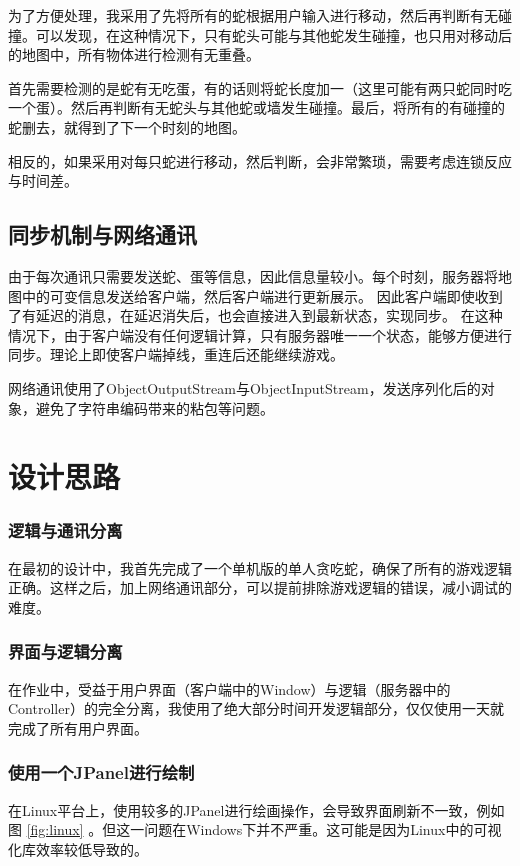 \documentclass[12pt]{article}
\begin{document}
  为了方便处理，我采用了先将所有的蛇根据用户输入进行移动，然后再判断有无碰撞。可以发现，在这种情况下，只有蛇头可能与其他蛇发生碰撞，也只用对移动后的地图中，所有物体进行检测有无重叠。
  
  首先需要检测的是蛇有无吃蛋，有的话则将蛇长度加一（这里可能有两只蛇同时吃一个蛋）。然后再判断有无蛇头与其他蛇或墙发生碰撞。最后，将所有的有碰撞的蛇删去，就得到了下一个时刻的地图。
  
  相反的，如果采用对每只蛇进行移动，然后判断，会非常繁琐，需要考虑连锁反应与时间差。
  
  \subsection*{同步机制与网络通讯}
  由于每次通讯只需要发送蛇、蛋等信息，因此信息量较小。每个时刻，服务器将地图中的可变信息发送给客户端，然后客户端进行更新展示。
  因此客户端即使收到了有延迟的消息，在延迟消失后，也会直接进入到最新状态，实现同步。
  在这种情况下，由于客户端没有任何逻辑计算，只有服务器唯一一个状态，能够方便进行同步。理论上即使客户端掉线，重连后还能继续游戏。
  
  网络通讯使用了ObjectOutputStream与ObjectInputStream，发送序列化后的对象，避免了字符串编码带来的粘包等问题。
  
  \section{设计思路}
  
  \subsubsection*{逻辑与通讯分离}
  在最初的设计中，我首先完成了一个单机版的单人贪吃蛇，确保了所有的游戏逻辑正确。这样之后，加上网络通讯部分，可以提前排除游戏逻辑的错误，减小调试的难度。
  
  \subsubsection*{界面与逻辑分离}
  在作业中，受益于用户界面（客户端中的Window）与逻辑（服务器中的Controller）的完全分离，我使用了绝大部分时间开发逻辑部分，仅仅使用一天就完成了所有用户界面。
  
  \subsubsection*{使用一个JPanel进行绘制}
  在Linux平台上，使用较多的JPanel进行绘画操作，会导致界面刷新不一致，例如图 \ref{fig:linux} 。但这一问题在Windows下并不严重。这可能是因为Linux中的可视化库效率较低导致的。
  
\end{document}
